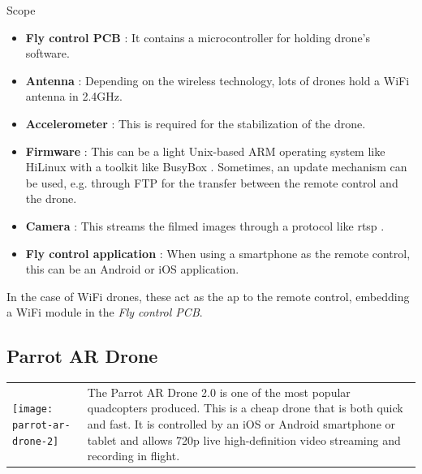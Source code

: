 \begin{chaptercover}{Scope}
\begin{itemize}
  \item \textbf{Fly control PCB} : It contains a microcontroller for holding drone's software.
  \item \textbf{Antenna} : Depending on the wireless technology, lots of drones hold a WiFi antenna in 2.4GHz.
  \item \textbf{Accelerometer} : This is required for the stabilization of the drone.
  \item \textbf{Firmware} : This can be a light Unix-based ARM operating system like HiLinux \cite{hilinux} with a toolkit like BusyBox \cite{busybox}. Sometimes, an update mechanism can be used, e.g. through FTP for the transfer between the remote control and the drone.
  \item \textbf{Camera} : This streams the filmed images through a protocol like \acrshort{rtsp} \cite{rfc7826}.
  \item \textbf{Fly control application} : When using a smartphone as the remote control, this can be an Android or iOS application.
\end{itemize}

In the case of WiFi drones, these act as the \acrfull{ap} to the remote control, embedding a WiFi module in the \textit{Fly control PCB}.

\subsection{Parrot AR Drone}

\begin{center}
\begin{tabular}{m{5cm}m{12.3cm}}
\hyphenation{produced}
\texttt{[image: parrot-ar-drone-2]} & The Parrot AR Drone 2.0 is one of the most popular quadcopters produced. This is a cheap drone that is both quick and fast. It is controlled by an iOS or Android smartphone or tablet and allows 720p live high-definition video streaming and recording in flight. \\
\end{tabular}
\end{center}


\end{chaptercover}
